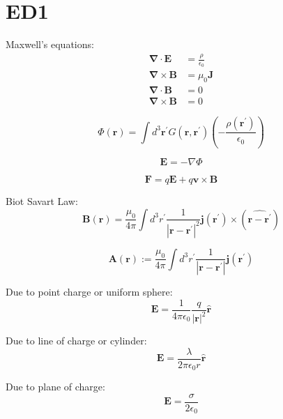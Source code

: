 \documentclass[a4paper, twocolumn]{article}
\renewcommand{\vec}[1]{\boldsymbol{#1}}
\begin{document}
\footnotesize

\section{ED1}

Maxwell's equations:
\begin{align*}
    \vec{\nabla} \cdot \vec{E} &= \frac{\rho}{\epsilon_{0}} \\
    \vec{\nabla} \times \vec{B} &= \mu_{0} \vec{J} \\
    \vec{\nabla} \cdot \vec{B} &= 0 \\
    \vec{\nabla} \times \vec{B} &= 0
\end{align*}

\begin{equation*}
    \Phi(\vec{r}) = \int d^{3} \vec{r}^{\prime} G(\vec{r}, \vec{r}^{\prime}) \left( - \frac{\rho(\vec{r}^{\prime})}{\epsilon_{0}}\right)
\end{equation*}

\begin{equation*}
    \vec{E} = - \nabla \Phi
\end{equation*}

\begin{equation*}
    \vec{F} = q\vec{E} + q\vec{v} \times \vec{B}
\end{equation*}


Biot Savart Law:
\begin{equation*}
    \vec{B}(\vec{r}) = \frac{\mu_0}{4 \pi} \int d^{3}r^{\prime} \frac{1}{| \vec{r} - \vec{r}^{\prime}|^{2}} \vec{j}(\vec{r}^{\prime}) \times (\hat{\vec{r} - \vec{r}^{\prime}})
\end{equation*}

\begin{equation*}
    \vec{A}(\vec{r}) := \frac{\mu_{0}}{4 \pi} \int d^{3} r^{\prime} \frac{1}{| \vec{r} - \vec{r}^{\prime}|} \vec{j}(\vec{r}^{\prime})
\end{equation*}

Due to point charge or uniform sphere:
\begin{equation*}
    \vec{E} = \frac{1}{4 \pi \epsilon_{0}} \frac{q}{|\vec{r}|^2} \hat{\vec{r}}
\end{equation*}

Due to line of charge or cylinder:
\begin{equation*}
    \vec{E} = \frac{\lambda}{2 \pi \epsilon_{0} r} \hat{\vec{r}}
\end{equation*}

Due to plane of charge:
\begin{equation*}
    \vec{E} = \frac{\sigma}{2 \epsilon_{0}}
\end{equation*}
\end{document}
